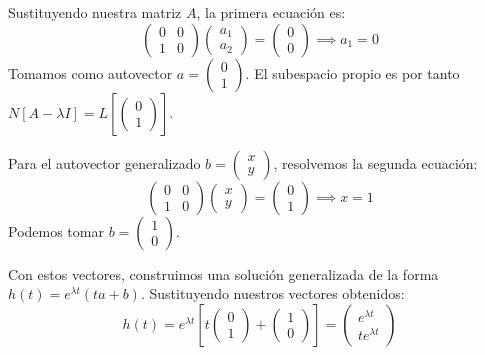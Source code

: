 Sustituyendo nuestra matriz $A$, la primera ecuación es:
\[
    \begin{pmatrix} 0 & 0 \\ 1 & 0 \end{pmatrix} \begin{pmatrix} a_1 \\ a_2 \end{pmatrix} = \begin{pmatrix} 0 \\ 0 \end{pmatrix} \implies a_1 = 0
\]
Tomamos como autovector $a = \begin{pmatrix} 0 \\ 1 \end{pmatrix}$. El subespacio propio es por tanto $N[A-\lambda I] = L\left[ \begin{pmatrix} 0 \\ 1 \end{pmatrix} \right]$.

Para el autovector generalizado $b = \begin{pmatrix} x \\ y \end{pmatrix}$, resolvemos la segunda ecuación:
\[
    \begin{pmatrix} 0 & 0 \\ 1 & 0 \end{pmatrix} \begin{pmatrix} x \\ y \end{pmatrix} = \begin{pmatrix} 0 \\ 1 \end{pmatrix} \implies x = 1
\]
Podemos tomar $b = \begin{pmatrix} 1 \\ 0 \end{pmatrix}$.

Con estos vectores, construimos una solución generalizada de la forma $h(t) = e^{\lambda t}(ta + b)$. Sustituyendo nuestros vectores obtenidos:
\[
    h(t) = e^{\lambda t} \left[ t \begin{pmatrix} 0 \\ 1 \end{pmatrix} + \begin{pmatrix} 1 \\ 0 \end{pmatrix} \right] = \begin{pmatrix} e^{\lambda t} \\ t e^{\lambda t} \end{pmatrix}
\]

